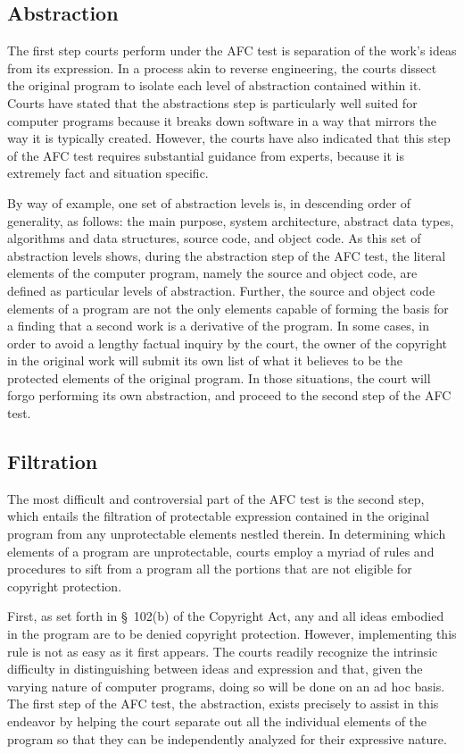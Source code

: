 \subsection{Abstraction}

The first step courts perform under the AFC test is separation of the
work's ideas from its expression. In a process akin to reverse
engineering, the courts dissect the original program to isolate each level
of abstraction contained within it. Courts have stated that the
abstractions step is particularly well suited for computer programs
because it breaks down software in a way that mirrors the way it is
typically created. However, the courts have also indicated that this step
of the AFC test requires substantial guidance from experts, because it is
extremely fact and situation specific.

By way of example, one set of abstraction levels is, in descending order
of generality, as follows: the main purpose, system architecture, abstract
data types, algorithms and data structures, source code, and object
code. As this set of abstraction levels shows, during the abstraction step
of the AFC test, the literal elements of the computer program, namely the
source and object code, are defined as particular levels of
abstraction. Further, the source and object code elements of a program are
not the only elements capable of forming the basis for a finding that a
second work is a derivative of the program. In some cases, in order to
avoid a lengthy factual inquiry by the court, the owner of the copyright in
the original work will submit its own list of what it believes to be the
protected elements of the original program. In those situations, the court
will forgo performing its own abstraction, and proceed to the second step of
the AFC test.

\subsection{Filtration}

The most difficult and controversial part of the AFC test is the second
step, which entails the filtration of protectable expression contained in
the original program from any unprotectable elements nestled therein. In
determining which elements of a program are unprotectable, courts employ a
myriad of rules and procedures to sift from a program all the portions
that are not eligible for copyright protection.

First, as set forth in \S~102(b) of the Copyright Act, any and all ideas
embodied in the program are to be denied copyright protection. However,
implementing this rule is not as easy as it first appears. The courts
readily recognize the intrinsic difficulty in distinguishing between ideas
and expression and that, given the varying nature of computer programs,
doing so will be done on an ad hoc basis. The first step of the AFC test,
the abstraction, exists precisely to assist in this endeavor by helping
the court separate out all the individual elements of the program so that
they can be independently analyzed for their expressive nature.

